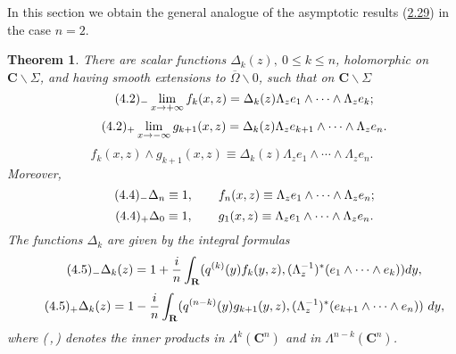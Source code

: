 \documentclass{surv-l}
\theoremstyle{plain}
\newtheorem{theorem}{Theorem}[section]
\theoremstyle{definition}
\numberwithin{equation}{chapter}
\begin{document}
In this section we obtain the general analogue of the asymptotic results (\hyperref[eq2.29-]{2.29}) in the case $n=2$.
\setcounter{theorem}{0}
\begin{theorem}\label{thm4.1}
There are scalar functions $\Delta_{k}(z),\ 0\leq k\leq n$, holomorphic on $ \mathbf{C}\backslash \Sigma$, and having smooth extensions to $\overline{\Omega}\backslash 0$, such that on $ \mathbf{C}\backslash \Sigma$
\begin{equation*}
\tag*{$(4.2)_{-}$} \displaystyle \lim_{x\rightarrow+\infty}  f_{k}(x,z)=\Delta_{k}(z)\Lambda_{z}e_{1}\wedge\cdots \wedge\Lambda_{z}e_{k};
\end{equation*}
\begin{equation*}
\tag*{$(4.2)_{+}$} \displaystyle \lim_{x\rightarrow-\infty}  g_{k+1}(x, z)=\Delta_{k}(z)\Lambda_{z}e_{k+1}\wedge\cdots \wedge\Lambda_{z}e_{n}.
\end{equation*}
\renewcommand\theequation{\thesection.\arabic{equation}}
\setcounter{equation}{2}
\begin{equation}\label{eq4.3}
f_{k}(x,z)\wedge g_{k+1}(x,z)\equiv\Delta_{k}(z)\Lambda_{z}e_{1}\wedge\cdots \wedge\Lambda_{z}e_{n}.
\end{equation}
Moreover,
\begin{equation*}
\tag*{$(4.4)_{-}$} \Delta_{n}\equiv 1,\qquad  f_{n}(x, z)\equiv\Lambda_{z}e_{1}\wedge\cdots \wedge\Lambda_{z}e_{n};
\end{equation*}
\begin{equation*}
\tag*{$(4.4)_{+}$} \Delta_{0}\equiv 1,\qquad  g_{1}(x,z)\equiv\Lambda_{z}e_{1}\wedge\cdots \wedge\Lambda_{z}e_{n}.
\end{equation*}
The functions $\Delta_{k}$ are given by the integral formulas
\begin{equation*}
\tag*{$(4.5)_{-}$} \Delta_{k}(z) =1+\displaystyle \frac{i}{n}\int_{\mathbf{R}}(q^{(k)}(y)f_{k}(y, z), (\Lambda_{z}^{-1})^{*}(e_{1}\wedge\cdots \wedge e_{k})) dy,
\end{equation*}
\begin{equation*}
\tag*{$(4.5)_{+}$} \Delta_{k}(z)=1-\frac{i}{n}\int_{\mathbf{R}}(q^{(n-k)}(y)g_{k+1}(y, z), (\Lambda_{z}^{-1})^{*}(e_{k+1}\wedge\cdots \wedge e_{n}))\ dy,
\end{equation*}
where \emph{(\,,\,)} denotes the inner products in $\Lambda^{k}(\mathbf{C}^{n})$ and in $\Lambda^{n-k}(\mathbf{C}^{n})$.
\end{theorem}
\end{document}
